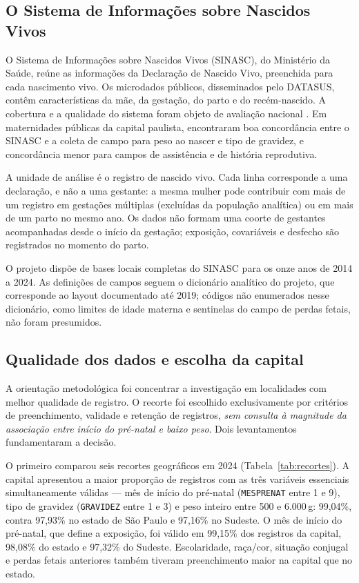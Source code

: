 \documentclass[11pt,a4paper]{article}
\newcommand{\campo}[1]{\texttt{#1}}       %
\begin{document}
\subsection{O Sistema de Informações sobre Nascidos Vivos}

O Sistema de Informações sobre Nascidos Vivos (SINASC), do Ministério da Saúde, reúne as
informações da Declaração de Nascido Vivo, preenchida para cada nascimento vivo. Os
microdados públicos, disseminados pelo DATASUS, contêm características da mãe, da
gestação, do parto e do recém-nascido. A cobertura e a qualidade do sistema foram objeto
de avaliação nacional \cite{szwarcwald2019}. Em maternidades públicas da capital paulista,
 encontraram boa concordância entre o SINASC e a coleta de campo
para peso ao nascer e tipo de gravidez, e concordância menor para campos de assistência e
de história reprodutiva.

A unidade de análise é o registro de nascido vivo. Cada linha corresponde a uma
declaração, e não a uma gestante: a mesma mulher pode contribuir com mais de um registro
em gestações múltiplas (excluídas da população analítica) ou em mais de um parto no mesmo
ano. Os dados não formam uma coorte de gestantes acompanhadas desde o início da gestação;
exposição, covariáveis e desfecho são registrados no momento do parto.

O projeto dispõe de bases locais completas do SINASC para os onze anos de 2014 a 2024. As
definições de campos seguem o dicionário analítico do projeto, que corresponde ao layout
documentado até 2019; códigos não enumerados nesse dicionário, como limites de idade
materna e sentinelas do campo de perdas fetais, não foram presumidos.

\subsection{Qualidade dos dados e escolha da capital}\label{sec:qualidade}

A orientação metodológica foi concentrar a investigação em localidades com melhor
qualidade de registro. O recorte foi escolhido exclusivamente por critérios de
preenchimento, validade e retenção de registros, \emph{sem consulta à magnitude da
associação entre início do pré-natal e baixo peso}. Dois levantamentos fundamentaram a
decisão.

O primeiro comparou seis recortes geográficos em 2024 (Tabela~\ref{tab:recortes}). A
capital apresentou a maior proporção de registros com as três variáveis essenciais
simultaneamente válidas --- mês de início do pré-natal (\campo{MESPRENAT} entre 1 e 9),
tipo de gravidez (\campo{GRAVIDEZ} entre 1 e 3) e peso inteiro entre 500 e 6.000\,g:
99,04\%, contra 97,93\% no estado de São Paulo e 97,16\% no Sudeste. O mês de início do
pré-natal, que define a exposição, foi válido em 99,15\% dos registros da capital,
98,08\% do estado e 97,32\% do Sudeste. Escolaridade, raça/cor, situação conjugal e
perdas fetais anteriores também tiveram preenchimento maior na capital que no estado.
\end{document}
